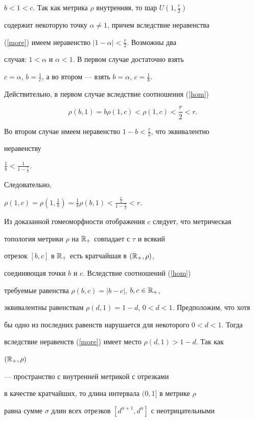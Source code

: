 $b<1<c$. Так как метрика $\rho$ внутренняя, то шар $U(1,\frac{r}{2})$


содержит некоторую точку $\alpha \neq 1$, причем вследствие неравенства


(\ref{more}) имеем неравенство $|1-\alpha|< \frac{r}{2}$. Возможны два


случая: $1< \alpha$ и $\alpha< 1$. В первом случае достаточно взять


$c= \alpha$, $b= \frac{1}{c}$, а во втором --- взять $b=\alpha$, $c=\frac{1}{b}$.


Действительно, в первом случае вследствие соотношения (\ref{hom})


$$


\rho(b,1)=b\rho(1,c)< \rho(1,c)< \frac{r}{2}< r.


$$


Во втором случае имеем неравенство $1-b< \frac{r}{2}$, что эквивалентно


неравенству


$\frac{1}{b}<\frac{1}{1-\frac{r}{2}}$.


Следовательно,


$\rho(1,c)=\rho(1,\frac{1}{b})=\frac{1}{b}\rho(b,1)<


\frac{\frac{r}{2}}{1-\frac{r}{2}}< r$.





Из доказанной гомеоморфности отображения $c$ следует, что метрическая


топология метрики $\rho$ на $\Bbb{R}_{+}$ совпадает с $\tau$ и всякий


отрезок $[b,c]$ в $\Bbb{R}_{+}$ есть кратчайшая в $(\Bbb{R}_{+},\rho)$,


соединяющая точки $b$ и $c$. Вследствие соотношений (\ref{hom})


требуемые равенства $\rho(b,c)= |b-c|$, $b,c \in \Bbb{R}_{+}$,


эквивалентны равенствам $\rho(d,1)=1-d$, $0<d<1$. Предположим, что хотя


бы одно из последних равенств нарушается для некоторого $0<d<1$. Тогда


вследствие неравенств (\ref{more}) имеет место $\rho(d,1)> 1-d$. Так как


$(\Bbb{R}_{+},\rho)$


--- пространство с внутренней метрикой с отрезками


в качестве кратчайших, то длина интервала $(0,1]$ в метрике $\rho$


равна сумме $\sigma$ длин всех отрезков $[d^{n+1},d^{n}]$ с неотрицательными


